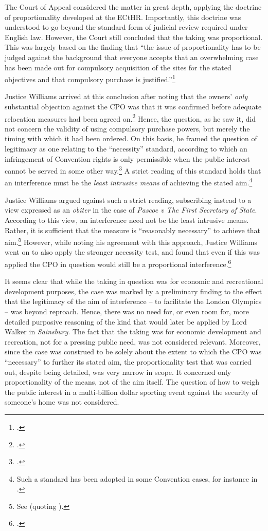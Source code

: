 The Court of Appeal considered the matter in great depth, applying the doctrine of proportionality developed at the ECtHR. Importantly, this doctrine was understood to go beyond the standard form of judicial review required under English law. However, the Court still concluded that the taking was proportional. This was largely based on the finding that ``the issue of proportionality has to be judged against the background that everyone accepts that an overwhelming case has been made out for compulsory acquisition of the sites for the stated objectives and that compulsory purchase is justified.''\footcite[42]{smith08} 

Justice Williams arrived at this conclusion after noting that the owners' {\it only} substantial objection against the CPO was that it was confirmed before adequate relocation measures had been agreed on.\footcite[42]{smith08} Hence, the question, as he saw it, did not concern the validity of using compulsory purchase powers, but merely the timing with which it had been ordered. On this basis, he framed the question of legitimacy as one relating to the ``necessity'' standard, according to which an infringement of Convention rights is only permissible when the public interest cannot be served in some other way.\footcite[43]{smith08} A strict reading of this standard holds that an interference must be the {\it least intrusive means} of achieving the stated aim.\footnote{Such a standard has been adopted in some Convention cases, for instance in \cite{samaroo01}.}

Justice Williams argued against such a strict reading, subscribing instead to a view expressed as an {\it obiter} in the case of {\it Pascoe v The First Secretary of State}. According to this view, an interference need not be the least intrusive means. Rather, it is sufficient that the measure is ``reasonably necessary'' to achieve that aim.\footnote{See \cite[74-75]{pascoe06} (quoting \cite[25]{clay04}).} However, while noting his agreement with this approach, Justice Williams went on to also apply the stronger necessity test, and found that even if this was applied the CPO in question would still be a proportional interference.\footcite[41-50]{smith08}

It seems clear that while the taking in question was for economic and recreational development purposes, the case was marked by a preliminary finding to the effect that the legitimacy of the aim of interference -- to facilitate the London Olympics -- was beyond reproach. Hence, there was no need for, or even room for, more detailed purposive reasoning of the kind that would later be applied by Lord Walker in {\it Sainsbury}. The fact that the taking was for economic development and recreation, not for a pressing public need, was not considered relevant. Moreover, since the case was construed to be solely about the extent to which the CPO was ``necessary'' to further its stated aim, the proportionality test that was carried out, despite being detailed, was very narrow in scope. It concerned only proportionality of the means, not of the aim itself. The question of how to weigh the public interest in a multi-billion dollar sporting event against the security of someone's home was not considered.

